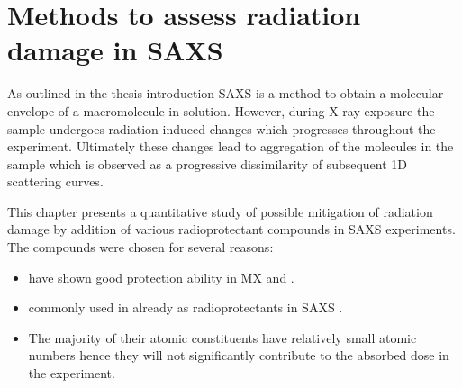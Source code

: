 \chapter{Methods to assess radiation damage in SAXS}
\label{chap:Methods to assess radiation damage in SAXS}

 As outlined in the thesis introduction SAXS is a method to obtain a molecular envelope of a macromolecule in solution.
 However, during X-ray exposure the sample undergoes radiation induced changes which progresses throughout the experiment.
 Ultimately these changes lead to aggregation of the molecules in the sample which is observed as a progressive dissimilarity of subsequent 1D scattering curves.

 This chapter presents a quantitative study of possible mitigation of radiation damage by addition of various radioprotectant compounds in SAXS experiments. The compounds were chosen for several reasons:
 \begin{itemize}
     \item have shown good protection ability in MX \cite{allan2012} and \cite{southworth2007radioprotectant}.
     \item commonly used in already as radioprotectants in SAXS \cite{grishaev2012sample}.
     \item The majority of their atomic constituents have relatively small atomic numbers hence they will not significantly contribute to the absorbed dose in the experiment.
 \end{itemize}
